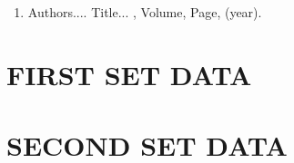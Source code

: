 \documentclass[a4paper, 12pt, oneside]{sastra}
\begin{document}




%
%
\begin{singlespace}
	
\end{singlespace}

\listofpapers %

\begin{enumerate}  
	\item Authors....  \newblock
	Title...
	, Volume,
	Page, (year).
\end{enumerate}  



\appendix
%
\chapter{FIRST SET DATA}
%
%
%
%
\chapter{SECOND SET DATA}
%
%
%
%
%




\plagarism
\end{document}
